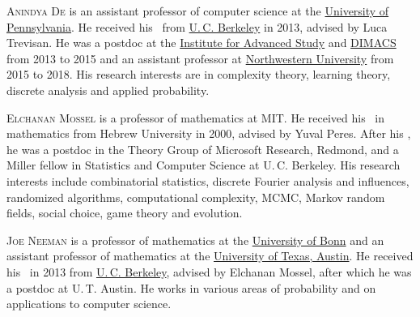 \documentclass{toc}
\begin{document}
\begin{tocaboutauthors}
\begin{tocabout}[de]
\textsc{Anindya De} is an assistant professor of computer science at
the  \href{www.upenn.edu}{University of Pennsylvania}. He received his
\phd\ from \href{http://www.berkeley.edu/index.html}{U.\,C. Berkeley}
in 2013, advised by Luca Trevisan.
He was a postdoc at the \href{https://www.ias.edu/}{Institute for
Advanced Study} and \href{dimacs.rutgers.edu/}{DIMACS} from
2013 to 2015 and an assistant professor at
\href{www.northwestern.edu}{Northwestern University} from
2015 to 2018.  His research interests are in complexity theory,
learning theory, discrete analysis and applied probability.
\end{tocabout}
\begin{tocabout}[mossel]
\textsc{Elchanan Mossel} is a professor of mathematics at MIT\@.
He received his \phd\ in mathematics from Hebrew University in 2000,
advised by Yuval Peres.  After his \phd, he was a postdoc in
the Theory Group of Microsoft Research, Redmond,
and a Miller fellow in Statistics and Computer Science at U.\,C. Berkeley.
His research interests include combinatorial statistics,
discrete Fourier analysis and influences, randomized algorithms,
computational complexity, MCMC, Markov random fields,
social choice, game theory and evolution.
\end{tocabout}
\begin{tocabout}[neeman]
\textsc{Joe Neeman} is a professor of mathematics at the
\href{www.math.uni-bonn.de}{University of Bonn} and
an assistant professor of mathematics at the
\href{www.math.utexas.edu}{University of Texas, Austin}.
He received his \phd\ in 2013 from
\href{http://www.stat.berkeley.edu}{U.\,C. Berkeley},
advised by Elchanan Mossel, after which he was a postdoc at U.\,T. Austin.
He works in various areas of probability and on applications to computer
science.
\end{tocabout}

\end{tocaboutauthors}
\end{document}
